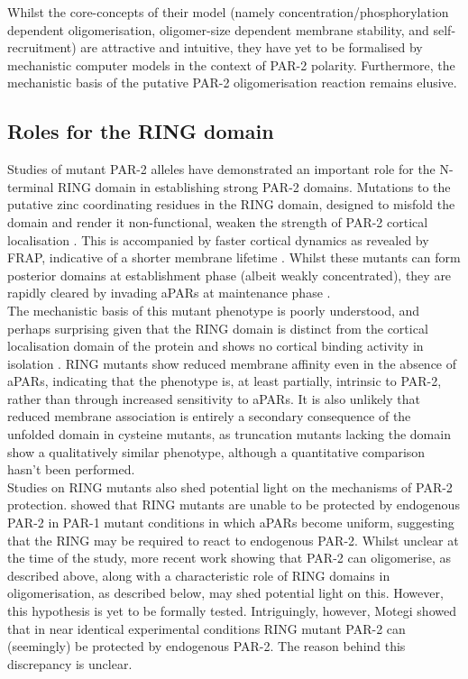 \documentclass[12pt]{"report"}
\begin{document}
Whilst the core-concepts of their model (namely concentration/phosphorylation dependent oligomerisation, oligomer-size dependent membrane stability, and self-recruitment) are attractive and intuitive, they have yet to be formalised by mechanistic computer models in the context of PAR-2 polarity. Furthermore, the mechanistic basis of the putative PAR-2 oligomerisation reaction remains elusive.\\


\subsection{Roles for the RING domain}

Studies of mutant PAR-2 alleles have demonstrated an important role for the N-terminal RING domain in establishing strong PAR-2 domains. Mutations to the putative zinc coordinating residues in the RING domain, designed to misfold the domain and render it non-functional, weaken the strength of PAR-2 cortical localisation \citep{Hao2006}. This is accompanied by faster cortical dynamics as revealed by FRAP, indicative of a shorter membrane lifetime \citep{Motegi2011}. Whilst these mutants can form posterior domains at establishment phase (albeit weakly concentrated), they are rapidly cleared by invading aPARs at maintenance phase \citep{Hao2006}.\\

The mechanistic basis of this mutant phenotype is poorly understood, and perhaps surprising given that the RING domain is distinct from the cortical localisation domain of the protein and shows no cortical binding activity in isolation \citep{Hao2006}. RING mutants show reduced membrane affinity even in the absence of aPARs, indicating that the phenotype is, at least partially, intrinsic to PAR-2, rather than through increased sensitivity to aPARs. It is also unlikely that reduced membrane association is entirely a secondary consequence of the unfolded domain in cysteine mutants, as truncation mutants lacking the domain show a qualitatively similar phenotype, although a quantitative comparison hasn’t been performed.\\

Studies on RING mutants also shed potential light on the mechanisms of PAR-2 protection. \textcite{Hao2006} showed that RING mutants are unable to be protected by endogenous PAR-2 in PAR-1 mutant conditions in which aPARs become uniform, suggesting that the RING may be required to react to endogenous PAR-2. Whilst unclear at the time of the study, more recent work showing that PAR-2 can oligomerise, as described above, along with a characteristic role of RING domains in oligomerisation, as described below, may shed potential light on this. However, this hypothesis is yet to be formally tested. Intriguingly, however, Motegi showed that in near identical experimental conditions RING mutant PAR-2 can (seemingly) be protected by endogenous PAR-2. The reason behind this discrepancy is unclear.\\
\end{document}
